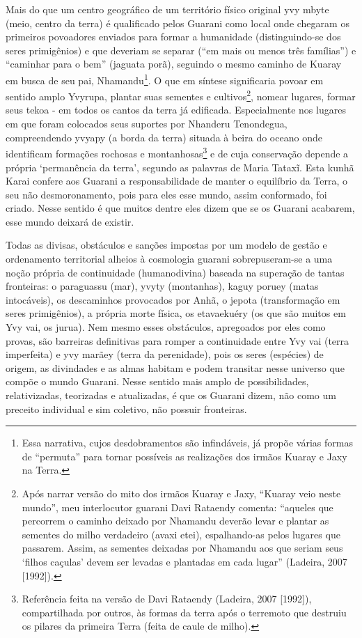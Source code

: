 Mais do que um centro geográfico de um território físico original yvy
mbyte (meio, centro da terra) é qualificado pelos Guarani como local
onde chegaram os primeiros povoadores enviados para formar a humanidade
(distinguindo-se dos seres primigênios) e que deveriam se separar (``em
mais ou menos três famílias'') e ``caminhar para o bem'' (jaguata porã),
seguindo o mesmo caminho de Kuaray em busca de seu pai,
Nhamandu\footnote{Essa narrativa, cujos desdobramentos são infindáveis,
já propõe várias formas de ``permuta'' para tornar possíveis as
realizações dos irmãos Kuaray e Jaxy na Terra.}.  O que em síntese
significaria povoar em sentido amplo Yvyrupa, plantar suas sementes e
cultivos\footnote{Após narrar versão do mito dos irmãos Kuaray e Jaxy,
``Kuaray veio neste mundo'', meu interlocutor guarani Davi Rataendy
comenta: ``aqueles que percorrem o caminho deixado por Nhamandu deverão
levar e plantar as sementes do milho verdadeiro (avaxi etei),
espalhando-as pelos lugares que passarem. Assim, as sementes deixadas
por Nhamandu aos que seriam seus ‘filhos caçulas’ devem ser levadas e
plantadas em cada lugar'' (Ladeira, 2007 [1992]).}, nomear lugares,
formar seus tekoa - em todos os cantos da terra já edificada.
Especialmente nos lugares em que foram colocados seus suportes por
Nhanderu Tenondegua, compreendendo yvyapy (a borda da terra) situada à
beira do oceano onde identificam formações rochosas e
montanhosas\footnote{Referência feita na versão de Davi Rataendy
(Ladeira, 2007 [1992]), compartilhada por outros, às formas da terra
após o terremoto que destruiu os pilares da primeira Terra (feita de
caule de milho). } e de cuja conservação depende a própria ‘permanência
da terra’, segundo as palavras de Maria Tataxĩ.
Esta kunhã Karai confere aos Guarani a responsabilidade de manter o
equilíbrio da Terra, o seu não desmoronamento, pois para eles esse
mundo, assim conformado, foi criado. Nesse sentido é que muitos dentre
eles dizem que se os Guarani acabarem, esse mundo deixará de existir. 

Todas as divisas, obstáculos e sanções impostas por um modelo de gestão
e ordenamento territorial alheios à cosmologia guarani sobrepuseram-se
a uma noção própria de continuidade (humanodivina) baseada na superação
de tantas fronteiras: o paraguassu (mar), yvyty (montanhas), kaguy
poruey (matas intocáveis), os descaminhos provocados por Anhã, o jepota
(transformação em seres primigênios), a própria morte física, os
etavaekuéry (os que são muitos em Yvy vai, os jurua).  Nem mesmo esses
obstáculos, apregoados por eles como provas, são barreiras definitivas
para romper a continuidade entre Yvy vai (terra imperfeita) e yvy
marãey (terra da perenidade), pois os seres (espécies) de origem, as
divindades e as almas habitam e podem transitar nesse universo que
compõe o mundo Guarani. Nesse sentido mais amplo de possibilidades,
relativizadas, teorizadas e atualizadas, é que os Guarani dizem, não
como um preceito individual e sim coletivo, não possuir fronteiras. 

